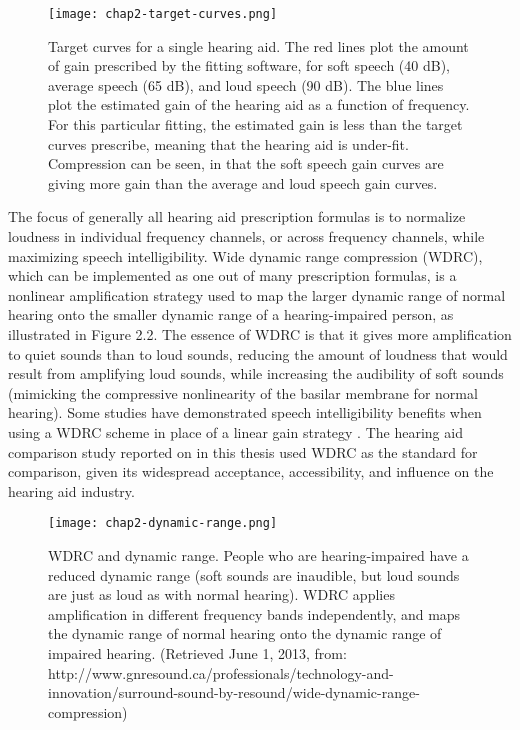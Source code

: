 \begin{figure}
\begin{center}
\texttt{[image: chap2-target-curves.png]} \\
\caption[Hearing aid target curves]{Target curves for a single hearing aid.  The red lines plot the amount of gain prescribed by the fitting software, for soft speech (40 dB), average speech (65 dB), and loud speech (90 dB).  The blue lines plot the estimated gain of the hearing aid as a function of frequency.  For this particular fitting, the estimated gain is less than the target curves prescribe, meaning that the hearing aid is under-fit.  Compression can be seen, in that the soft speech gain curves are giving more gain than the average and loud speech gain curves.}
\label{ch2-target-curves}
\end{center}
\end{figure}

The focus of generally all hearing aid prescription formulas is to normalize loudness in individual frequency channels, or across frequency channels, while maximizing speech intelligibility.  Wide dynamic range compression (WDRC), which can be implemented as one out of many prescription formulas, is a nonlinear amplification strategy used to map the larger dynamic range of normal hearing onto the smaller dynamic range of a hearing-impaired person, as illustrated in Figure 2.2.  The essence of WDRC is that it gives more amplification to quiet sounds than to loud sounds, reducing the amount of loudness that would result from amplifying loud sounds, while increasing the audibility of soft sounds (mimicking the compressive nonlinearity of the basilar membrane for normal hearing).  Some studies have demonstrated speech intelligibility benefits when using a WDRC scheme in place of a linear gain strategy \cite{Jenstad1999, Humes1999}.  The hearing aid comparison study reported on in this thesis used WDRC as the standard for comparison, given its widespread acceptance, accessibility, and influence on the hearing aid industry.

\begin{figure}
\begin{center}
\texttt{[image: chap2-dynamic-range.png]} \\
\caption[WDRC and dynamic range]{WDRC and dynamic range.  People who are hearing-impaired have a reduced dynamic range (soft sounds are inaudible, but loud sounds are just as loud as with normal hearing). WDRC applies amplification in different frequency bands independently, and maps the dynamic range of normal hearing onto the dynamic range of impaired hearing.  (Retrieved June 1, 2013, from: http://www.gnresound.ca/professionals/technology-and-innovation/surround-sound-by-resound/wide-dynamic-range-compression) }
\label{ch2-dynamic-range}
\end{center}
\end{figure}

